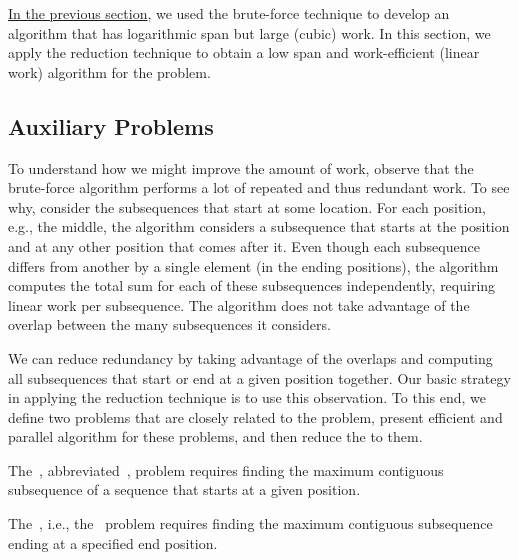 \begin{gram}
\href{sec:mcss::bf}{In the previous section}, we used the brute-force
technique to develop an algorithm that has logarithmic span but large
(cubic) work.
%
In this section, we apply the reduction technique to obtain a
low span and work-efficient (linear work) algorithm for the \MCSS{}
problem.
\end{gram}

\subsection{Auxiliary Problems}

\begin{gram}
To understand how we might improve the amount of work, observe that
the brute-force algorithm performs a lot of repeated and thus redundant work.
%
To see why, consider the subsequences that start at some location.
For each position, e.g., the middle, the algorithm considers a
subsequence that starts at the position and at any other position that
comes after it.
%
Even though each subsequence differs from another by a single element
(in the ending positions), the algorithm computes the total sum for
each of these subsequences independently, requiring linear work per
subsequence.
%
The algorithm does not take advantage of the overlap between the many subsequences it considers.
\end{gram}

\begin{gram}
We can reduce redundancy by taking advantage of the overlaps and
computing all subsequences that start or end at a given position
together.
%
Our basic strategy in applying the reduction technique is to use this
observation.
%
To this end, we define two problems that are closely related to the
\MCSS{} problem, present efficient and parallel algorithm for these
problems, and then reduce the \MCSS{} to them.
\end{gram}


\begin{definition}[\MCSSS{}]
The~,
abbreviated~, problem requires finding the maximum
contiguous subsequence of a sequence that starts at a given position.
\end{definition}




\begin{definition}
The~, i.e.,
the~ problem requires finding the maximum contiguous
subsequence ending at a specified end position.
\end{definition}


